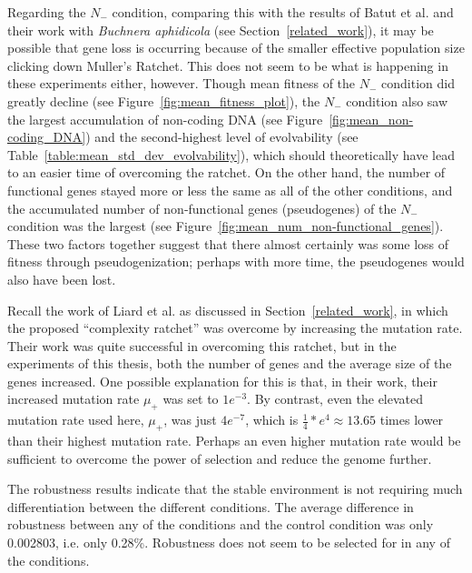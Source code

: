 Regarding the $N_-$ condition, comparing this with the results of Batut et al. and their work with \textit{Buchnera aphidicola} (see Section~\ref{related_work}), it may be possible that gene loss is occurring because of the smaller effective population size clicking down Muller's Ratchet. This does not seem to be what is happening in these experiments either, however. Though mean fitness of the $N_-$ condition did greatly decline (see Figure~\ref{fig:mean_fitness_plot}), the $N_-$ condition also saw the largest accumulation of non-coding DNA (see Figure~\ref{fig:mean_non-coding_DNA}) and the second-highest level of evolvability (see Table~\ref{table:mean_std_dev_evolvability}), which should theoretically have lead to an easier time of overcoming the ratchet. On the other hand, the number of functional genes stayed more or less the same as all of the other conditions, and the accumulated number of non-functional genes (pseudogenes) of the $N_-$ condition was the largest (see Figure~\ref{fig:mean_num_non-functional_genes}). These two factors together suggest that there almost certainly was some loss of fitness through pseudogenization; perhaps with more time, the pseudogenes would also have been lost.

Recall the work of Liard et al.\cite{Liard.2018} as discussed in Section~\ref{related_work}, in which the proposed ``complexity ratchet'' was overcome by increasing the mutation rate. Their work was quite successful in overcoming this ratchet, but in the experiments of this thesis, both the number of genes and the average size of the genes increased. One possible explanation for this is that, in their work, their increased mutation rate $\mu_+$ was set to $1e^{-3}$.  By contrast, even the elevated mutation rate used here, $\mu_+$, was just $4e^{-7}$, which is $\frac{1}{4}*e^4 \approx 13.65$ times lower than their highest mutation rate. Perhaps an even higher mutation rate would be sufficient to overcome the power of selection and reduce the genome further. 

The robustness results indicate that the stable environment is not requiring much differentiation between the different conditions.  The average difference in robustness between any of the conditions and the control condition was only 0.002803, i.e. only 0.28\%. Robustness does not seem to be selected for in any of the conditions. 



